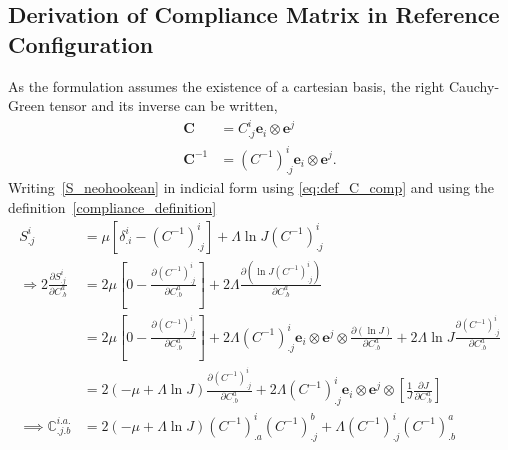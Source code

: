 \documentclass[../main.tex]{subfiles}
\begin{document}
\begin{appendices}
    \subsection{Derivation of Compliance Matrix in Reference Configuration}
    As the formulation assumes the existence of a cartesian basis, the right Cauchy-Green tensor and its inverse can be written, 
    \begin{equation} \label{eq:def_C_comp}
        \begin{split}
        {\boldsymbol{C}} &= {C^i_{.j}\boldsymbol{e}_i \otimes \boldsymbol{e}^j}\\
        {\boldsymbol{C}}^{-1} &= {\left(C^{-1}\right)^i_{.j} \boldsymbol{e}_i \otimes \boldsymbol{e}^j}.
        \end{split}
    \end{equation}
Writing~\eqref{S_neohookean} in indicial form using \eqref{eq:def_C_comp} and using the definition~\eqref{compliance_definition}
    \begin{equation} \label{eq:ref_comp_1}
        \begin{split}
            {S^i_{.j}} &= \mu {\left[\delta ^i_{.i} - \left(C^{-1}\right)^i_{.j}\right] + \Lambda \ln{J} \left(C^{-1}\right)^i_{.j}}\\
        {\Rightarrow 2\frac{\partial S^i_{.j}}{\partial C^a_{.b}}} &= 2\mu {\left[0 - \frac{\partial \left(C^{-1}\right)^i_{.j}}{\partial C^a_{.b}} \right] + 2\Lambda\frac{\partial \left(\ln{J}\left(C^{-1}\right)^i_{.j}\right)}{\partial C^a_{.b}}}\\
            &= 2\mu {\left[0 - \frac{\partial \left(C^{-1}\right)^i_{.j}}{\partial C^a_{.b}} \right] + 2\Lambda \left(C^{-1}\right)^i_{.j} \boldsymbol{e}_i \otimes \boldsymbol{e}^j \otimes \frac{\partial \left(\ln{J}\right)}{\partial C^a_{.b}} + 2\Lambda\ln{J} \frac{\partial \left(C^{-1}\right)^i_{.j}}{\partial C^a_{.b}}}\\
            &= {2\left(-\mu + \Lambda\ln{J}\right) \frac{\partial \left(C^{-1}\right)^i_{.j}}{\partial C^a_{.b}} + 2\Lambda\left(C^{-1}\right)^i_{.j} \boldsymbol{e}_i \otimes \boldsymbol{e}^j \otimes \left[\frac{1}{J} \frac{\partial J}{\partial C^a_{.b}}\right]}\\
        \implies \mathbb{C}^{i.a.}_{.j.b} &= 2\left(-\mu + \Lambda\ln{{J}}\right)\left({C}^{-1}\right)^{i}_{.a} \left({C}^{-1}\right)^{b}_{.j} + \Lambda {\left(C^{-1}\right)^i_{.j} \left(C^{-1}\right)^a_{.b}}
        \end{split}
    \end{equation}

\end{appendices}
\end{document}
